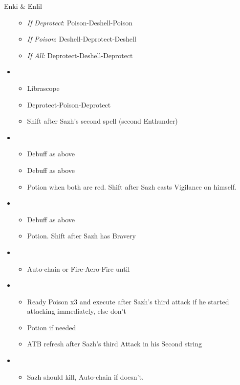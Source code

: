 \begin{paracol}{2}
\begin{battle}{Enki \& Enlil}
\begin{itemize}
        \begin{itemize}
            \item \textit{If Deprotect}: Poison-Deshell-Poison
            \item \textit{If Poison}: Deshell-Deprotect-Deshell
            \item \textit{If All}: Deprotect-Deshell-Deprotect
        \end{itemize}
    \item \second
    \begin{itemize}
        \item Librascope
        \item Deprotect-Poison-Deprotect
        \item Shift after Sazh's second spell (second Enthunder)
    \end{itemize}
    \item \third
    \begin{itemize}
        \item Debuff as above
        \item Debuff as above
        \item Potion when both are red. Shift after Sazh casts Vigilance on himself.
    \end{itemize}
    \item \second
    \begin{itemize}
        \item Debuff as above
        \item Potion. Shift after Sazh has Bravery
    \end{itemize}
    \item \fourth
    \begin{itemize}
        \item Auto-chain or Fire-Aero-Fire until \stagger
    \end{itemize}
    \item \sixth
    \begin{itemize}
        \item Ready Poison x3 and execute after Sazh's third attack if he started attacking immediately, else don't
        \item Potion if needed
        \item ATB refresh after Sazh's third Attack in his Second string
    \end{itemize}
    \item \first
    \begin{itemize}
        \item Sazh should kill, Auto-chain if doesn't.

\end{itemize}
\end{itemize}
\end{battle}
\end{paracol}
